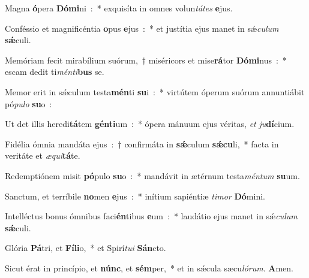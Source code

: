﻿\item Magna \textbf{ó}pera \textbf{Dó}\textbf{mi}ni~:~* exquisíta in omnes volun\emph{tá}\emph{tes} \textbf{e}jus.
\item Conféssio et magnificéntia \textbf{o}pus \textbf{e}jus~:~* et justítia ejus manet in sǽ\emph{cu}\emph{lum} \textbf{sǽ}culi.
\item Memóriam fecit mirabílium suórum,~† miséricors et mise\textbf{rá}tor \textbf{Dó}\textbf{mi}nus~:~* escam dedit ti\emph{mén}\emph{ti}\textbf{bus} se.
\item Memor erit in sǽculum testa\textbf{mén}ti \textbf{su}i~:~* virtútem óperum suórum annuntiábit pó\emph{pu}\emph{lo} \textbf{su}o~:
\item Ut det illis heredi\textbf{tá}tem \textbf{gén}\textbf{ti}um~:~* ópera mánuum ejus véritas, \emph{et} \emph{ju}\textbf{dí}cium.
\item Fidélia ómnia mandáta ejus~:~† confirmáta in \textbf{sǽ}culum \textbf{sǽ}\textbf{cu}li,~* facta in veritáte et \emph{æ}\emph{qui}\textbf{tá}te.
\item Redemptiónem misit \textbf{pó}pulo \textbf{su}o~:~* mandávit in ætérnum testa\emph{mén}\emph{tum} \textbf{su}um.
\item Sanctum, et terríbile \textbf{no}men \textbf{e}jus~:~* inítium sapiéntiæ \emph{ti}\emph{mor} \textbf{Dó}mini.
\item Intelléctus bonus ómnibus faci\textbf{én}tibus \textbf{e}um~:~* laudátio ejus manet in sǽ\emph{cu}\emph{lum} \textbf{sǽ}culi.
\item Glória \textbf{Pá}tri, et \textbf{Fí}\textbf{li}o,~* et Spirí\emph{tu}\emph{i} \textbf{Sán}cto.
\item Sicut érat in princípio, et \textbf{núnc}, et \textbf{sém}per,~* et in sǽcula sæcu\emph{ló}\emph{rum}. \textbf{A}men.
